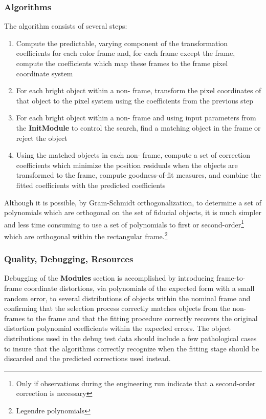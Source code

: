 \subsubsection{Algorithms}
The algorithm consists of several steps:
\begin{enumerate}
  \item Compute the predictable, varying component of the transformation
        coefficients for each color frame and, for each frame except the
        \/ frame, compute the coefficients which map these frames to
        the \/ frame pixel coordinate system
  \item For each bright object within a non-\/ frame, transform the
        pixel coordinates of that object to the \/ pixel system using
	the coefficients from the previous step
  \item For each bright object within a non-\/ frame and using input
        parameters from the {\bf InitModule} to control the search, find a
        matching object in the \/ frame or reject the object
  \item Using the matched objects in each non-\/ frame, compute a set
        of correction coefficients which minimize the position residuals when
        the objects are transformed to the \/ frame, compute
        goodness-of-fit measures, and combine the fitted coefficients with the
        predicted coefficients
\end{enumerate}

Although it is possible, by Gram-Schmidt orthogonalization, to determine a set
of polynomials which are orthogonal on the set of fiducial objects, it is much
simpler and less time consuming to use a set of polynomials to first or
second-order\footnote{Only if observations during the engineering run indicate
that a second-order correction is necessary}
which are orthogonal within the rectangular frame.\footnote{Legendre
polynomials}
\subsubsection{Quality, Debugging, Resources}

Debugging of the {\bf Modules} section is accomplished by introducing
frame-to-frame coordinate distortions, via polynomials of the expected form
with a small random error, to several distributions of objects within the
nominal frame and confirming that the selection process correctly matches
objects from the non-\/ frames to the \/ frame and that the
fitting procedure correctly recovers the original distortion polynomial
coefficients within the expected errors.
The object distributions used in the debug test data should include a few
pathological cases to insure that the algorithms correctly recognize when the
fitting stage should be discarded and the predicted corrections used instead.

